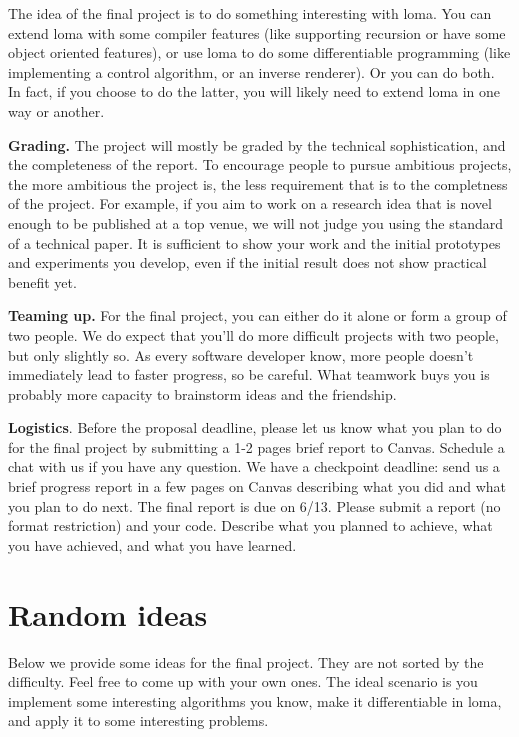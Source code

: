 




The idea of the final project is to do something interesting with loma. You can extend loma with some compiler features (like supporting recursion or have some object oriented features), or use loma to do some differentiable programming (like implementing a control algorithm, or an inverse renderer). Or you can do both. In fact, if you choose to do the latter, you will likely need to extend loma in one way or another.

\textbf{Grading.} The project will mostly be graded by the technical sophistication, and the completeness of the report. To encourage people to pursue ambitious projects, the more ambitious the project is, the less requirement that
is to the completness of the project. For example, if you aim to work on a research idea that is novel enough
to be published at a top venue, we will not judge you using the standard of a technical paper. It is 
sufficient to show your work and the initial prototypes and experiments you develop, even if the initial 
result does not show practical benefit yet.

\textbf{Teaming up.} 
For the final project, you can either do it alone or form a group of two people. We do expect that you’ll do more difficult projects with two people, but only slightly so. As every software developer
know, more people doesn’t immediately lead to faster progress, so be careful. What teamwork buys you is
probably more capacity to brainstorm ideas and the friendship.

\textbf{Logistics}. Before the proposal deadline, please let us know what you plan to do for the final project by submitting a 1-2 pages brief report to Canvas. 
Schedule a chat with us if you have any question. 
We have a checkpoint deadline: send us a brief progress report in a few pages on Canvas describing what you did and what you plan to do next.
The final report is due on 6/13. Please submit a report (no format restriction) and your code.
Describe what you planned to achieve, what you have achieved, and what you have learned.


\section{Random ideas}

Below we provide some ideas for the final project. They are not sorted by the difficulty. Feel free to come up with your own ones. The ideal scenario is you implement some interesting algorithms you know, make it differentiable in loma, and apply it to some interesting problems.

